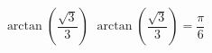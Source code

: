  {$\arctan \left( \dfrac{\sqrt{3}}{3} \right)$}
{ $\arctan \left( \dfrac{\sqrt{3}}{3} \right) = \dfrac{\pi}{6}$}
